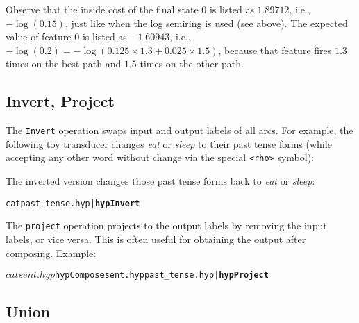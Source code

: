 \documentclass[12pt]{article}
\newcommand{\code}[1]{\texttt{#1}}
\begin{document}
Observe that the inside cost of the final state $0$ is listed as
$1.89712$, i.e., $-\log(0.15)$, just like when the log semiring is
used (see above). The expected value of feature $0$ is listed as
$-1.60943$, i.e., $-\log(0.2)=-\log(0.125 \times 1.3 + 0.025 \times
1.5)$, because that feature fires $1.3$ times on the best path and
$1.5$ times on the other path.

\subsection{Invert, Project}\label{sec:invert-project}

The \code{Invert} operation swaps input and output labels of all arcs.
For example, the following toy transducer changes \textit{eat} or
\textit{sleep} to their past tense forms (while accepting any other
word without change via the special \code{<rho>} symbol):


\noindent The inverted version changes those past tense forms back to
\textit{eat} or \textit{sleep}:

\begin{mdframed}\footnotesize\begin{alltt}
  cat past_tense.hyp | \textbf{hyp Invert}

\end{alltt}\end{mdframed}

The \code{project} operation projects to the output labels by removing
the input labels, or vice versa. This is often useful for obtaining
the output after composing. Example:

\begin{mdframed}\footnotesize\begin{alltt}
$ cat sent.hyp

$ hyp Compose sent.hyp past_tense.hyp | \textbf{hyp Project}

\end{alltt}\end{mdframed}

\subsection{Union}
\end{document}
